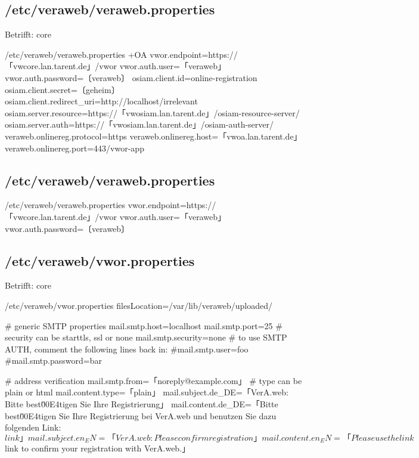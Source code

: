 \ifoa

\subsection{/etc/veraweb/veraweb.properties}\label{subsec:refcfg-vw-vwprop}

Betrifft: core

\begin{lstdump}{/etc/veraweb/veraweb.properties +OA}
vwor.endpoint=https://「vwcore.lan.tarent.de」/vwor
vwor.auth.user=「veraweb」
vwor.auth.password=〔veraweb〕
osiam.client.id=online-registration
osiam.client.secret=〔geheim〕
osiam.client.redirect_uri=http://localhost/irrelevant
osiam.server.resource=https://「vwosiam.lan.tarent.de」/osiam-resource-server/
osiam.server.auth=https://「vwosiam.lan.tarent.de」/osiam-auth-server/
veraweb.onlinereg.protocol=https
veraweb.onlinereg.host=「vwoa.lan.tarent.de」
veraweb.onlinereg.port=443/vwor-app
\end{lstdump}

\else%

\subsection{/etc/veraweb/veraweb.properties}\label{subsec:refcfg-vw-vwprop}

\begin{lstdump}{/etc/veraweb/veraweb.properties}
vwor.endpoint=https://「vwcore.lan.tarent.de」/vwor
vwor.auth.user=「veraweb」
vwor.auth.password=〔veraweb〕
\end{lstdump}

\fi%

\subsection{/etc/veraweb/vwor.properties}\label{subsec:refcfg-vw-vworprop}

\ifoa
Betrifft: core
\fi%

\begin{lstdump}{/etc/veraweb/vwor.properties}
filesLocation=/var/lib/veraweb/uploaded/

# generic SMTP properties
mail.smtp.host=localhost
mail.smtp.port=25
# security can be starttls, ssl or none
mail.smtp.security=none
# to use SMTP AUTH, comment the following lines back in:
#mail.smtp.user=foo
#mail.smtp.password=bar

# address verification
mail.smtp.from=「noreply@example.com」
# type can be plain or html
mail.content.type=「plain」
mail.subject.de_DE=「VerA.web: Bitte best\u00E4tigen Sie Ihre Registrierung」
mail.content.de_DE=「Bitte best\u00E4tigen Sie Ihre Registrierung bei VerA.web und benutzen Sie dazu folgenden Link: ${link}」
mail.subject.en_EN=「VerA.web: Please confirm registration」
mail.content.en_EN=「Please use the link ${link} to confirm your registration with VerA.web.」
\end{lstdump}

\fi%
